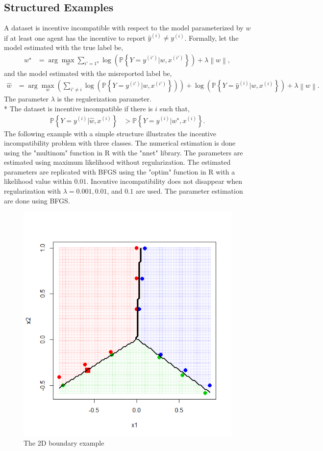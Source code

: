 \documentclass{article}
\begin{document}
\subsection{Structured Examples}
A dataset is incentive incompatible with respect to the model parameterized by $w $ if at least one agent has the incentive to report $\hat{y} ^{\left(i\right)} \neq  y^{\left(i\right)}$. Formally, let the model estimated with the true label be,
\begin{align*}
w^\star  &= \arg\displaystyle\max_{w} \displaystyle\sum_{i'=1^{n}} \log\left(\mathbb{P}\left\{Y = y^{\left(i'\right)} | w, x^{\left(i'\right)}\right\}\right) + \lambda \left\|w\right\|,
\end{align*}
and the model estimated with the misreported label be,
\begin{align*}
\hat{w} &= \arg\displaystyle\max_{w} \left(\displaystyle\sum_{i' \neq  i} \log\left(\mathbb{P}\left\{Y = y^{\left(i'\right)} | w, x^{\left(i'\right)}\right\}\right)\right) + \log\left(\mathbb{P}\left\{Y = \hat{y} ^{\left(i\right)} | w, x^{\left(i\right)}\right\}\right) + \lambda \left\|w\right\|.
\end{align*}
The parameter $\lambda$ is the regulerization parameter.
\\* The dataset is incentive incompatible if there is $i $ such that,
\begin{align*}
\mathbb{P}\left\{Y = y^{\left(i\right)} | \hat{w}, x^{\left(i\right)}\right\} &> \mathbb{P}\left\{Y = y^{\left(i\right)} | w^\star , x^{\left(i\right)}\right\}.
\end{align*}
The following example with a simple structure illustrates the incentive incompatibility problem with three classes. The numerical estimation is done using the "multinom" function in R with the "nnet" library. The parameters are estimated using maximum likelihood without regularization. The estimated parameters are replicated with BFGS using the "optim" function in R with a likelihood value within $0.01$. Incentive incompatibility does not disappear when regularization with $\lambda = 0.001, 0.01$, and $0.1$ are used. The parameter estimation are done using BFGS.
\begin{figure}[H]
\centering
\includegraphics[width=0.5\linewidth]{test_18_8}
\caption{The 2D boundary example}
\end{figure}
\end{document}
